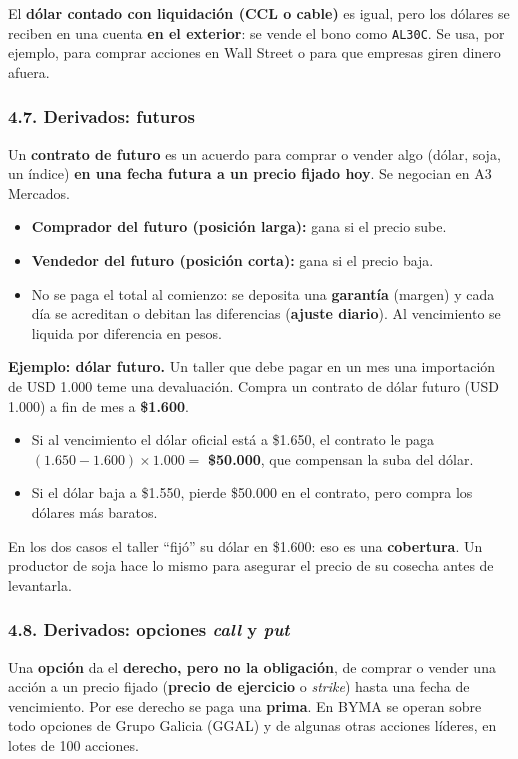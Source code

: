 El \textbf{dólar contado con liquidación (CCL o cable)} es igual, pero los dólares se reciben
en una cuenta \textbf{en el exterior}: se vende el bono como \texttt{AL30C}. Se usa, por
ejemplo, para comprar acciones en Wall Street o para que empresas giren dinero afuera.

\subsubsection*{4.7. Derivados: futuros}
Un \textbf{contrato de futuro} es un acuerdo para comprar o vender algo (dólar, soja, un índice)
\textbf{en una fecha futura a un precio fijado hoy}. Se negocian en A3 Mercados.
\begin{itemize}
  \item \textbf{Comprador del futuro (posición larga):} gana si el precio sube.
  \item \textbf{Vendedor del futuro (posición corta):} gana si el precio baja.
  \item No se paga el total al comienzo: se deposita una \textbf{garantía} (margen) y cada día
        se acreditan o debitan las diferencias (\textbf{ajuste diario}). Al vencimiento se
        liquida por diferencia en pesos.
\end{itemize}

\begin{recuadro}
\textbf{Ejemplo: dólar futuro.} Un taller que debe pagar en un mes una importación de USD 1.000
teme una devaluación. Compra un contrato de dólar futuro (USD 1.000) a fin de mes a
\textbf{\$1.600}.
\begin{itemize}[leftmargin=*,nosep]
  \item Si al vencimiento el dólar oficial está a \$1.650, el contrato le paga
        $(1.650 - 1.600) \times 1.000 =$ \textbf{\$50.000}, que compensan la suba del dólar.
  \item Si el dólar baja a \$1.550, pierde \$50.000 en el contrato, pero compra los dólares más
        baratos.
\end{itemize}
En los dos casos el taller ``fijó'' su dólar en \$1.600: eso es una \textbf{cobertura}. Un
productor de soja hace lo mismo para asegurar el precio de su cosecha antes de levantarla.
\end{recuadro}

\subsubsection*{4.8. Derivados: opciones \textit{call} y \textit{put}}
Una \textbf{opción} da el \textbf{derecho, pero no la obligación}, de comprar o vender una
acción a un precio fijado (\textbf{precio de ejercicio} o \textit{strike}) hasta una fecha de
vencimiento. Por ese derecho se paga una \textbf{prima}. En BYMA se operan sobre todo opciones
de Grupo Galicia (GGAL) y de algunas otras acciones líderes, en lotes de 100 acciones.

